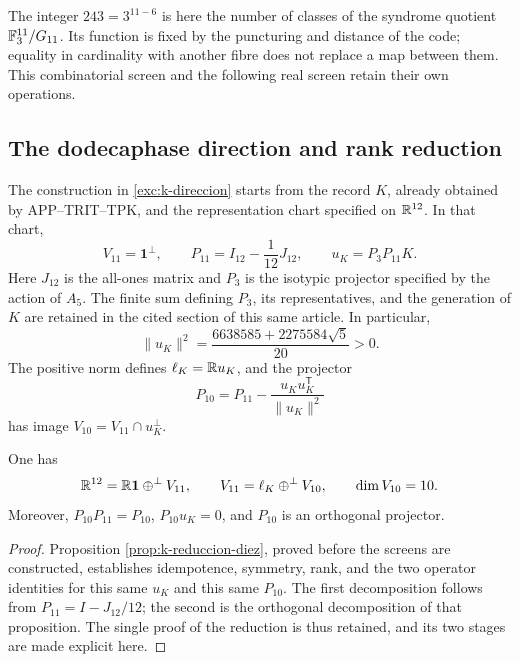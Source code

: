 The integer \(243=3^{11-6}\) is here the number of classes
of the syndrome quotient \(\mathbb F_3^{11}/G_{11}\). Its
function is fixed by the puncturing and distance of the
code; equality in cardinality with another fibre does not replace
a map between them. This combinatorial screen and the
following real screen retain their own operations.

\subsection{The dodecaphase direction and rank reduction}

The construction in \ref{exc:k-direccion} starts from the record
\(K\), already obtained by APP--TRIT--TPK, and the
representation chart specified on \(\mathbb R^{12}\). In that chart,
\begin{equation}
 V_{11}=\mathbf1^\perp,\qquad
 P_{11}=I_{12}-\frac1{12}J_{12},\qquad
 u_K=P_3P_{11}K.
 \label{iv:eq:p11-uk}
\end{equation}
Here \(J_{12}\) is the all-ones matrix and \(P_3\) is the
isotypic projector specified by the action of \(A_5\).
The finite sum defining \(P_3\), its representatives, and the
generation of \(K\) are retained in the cited section of
this same article. In particular,
\[
 \|u_K\|^2=\frac{6638585+2275584\sqrt5}{20}>0.
\]
The positive norm defines \(\ell_K=\mathbb R u_K\), and the
projector
\begin{equation}
 P_{10}=P_{11}-\frac{u_Ku_K^{\mathsf T}}{\|u_K\|^2}
 \label{iv:eq:p10}
\end{equation}
has image \(V_{10}=V_{11}\cap u_K^\perp\).

\begin{proposition}
\label{iv:prop:12-11-10}
One has
\[
 \mathbb R^{12}=\mathbb R\mathbf1\mathbin{\oplus^\perp}V_{11},\qquad
 V_{11}=\ell_K\mathbin{\oplus^\perp}V_{10},\qquad
 \dim V_{10}=10.
\]
Moreover, \(P_{10}P_{11}=P_{10}\), \(P_{10}u_K=0\), and
\(P_{10}\) is an orthogonal projector.
\end{proposition}
\begin{proof}
Proposition \ref{prop:k-reduccion-diez}, proved before
the screens are constructed, establishes idempotence, symmetry, rank, and
the two operator identities for this same \(u_K\) and this same
\(P_{10}\). The first decomposition follows from
\(P_{11}=I-J_{12}/12\); the second is the orthogonal decomposition
of that proposition. The single proof of the
reduction is thus retained, and its two stages are made explicit here.
\end{proof}

